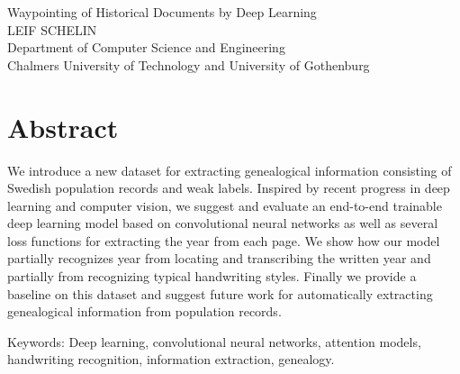 
Waypointing of Historical Documents by Deep Learning\\
LEIF SCHELIN\\
Department of Computer Science and Engineering\\
Chalmers University of Technology and University of Gothenburg\setlength{\parskip}{0.5cm}

\thispagestyle{plain}			%
\section*{Abstract}

We introduce a new dataset for extracting genealogical information consisting of Swedish population records and weak labels.
Inspired by recent progress in deep learning and computer vision, we suggest and evaluate an end-to-end trainable deep learning model based on convolutional neural networks as well as several loss functions for extracting the year from each page.
We show how our model partially recognizes year from locating and transcribing the written year and partially from recognizing typical handwriting styles.
Finally we provide a baseline on this dataset and suggest future work for automatically extracting genealogical information from population records.

\vfill
Keywords: Deep learning, convolutional neural networks, attention models, handwriting recognition, information extraction, genealogy.

\newpage				%
\thispagestyle{empty}
\mbox{}
